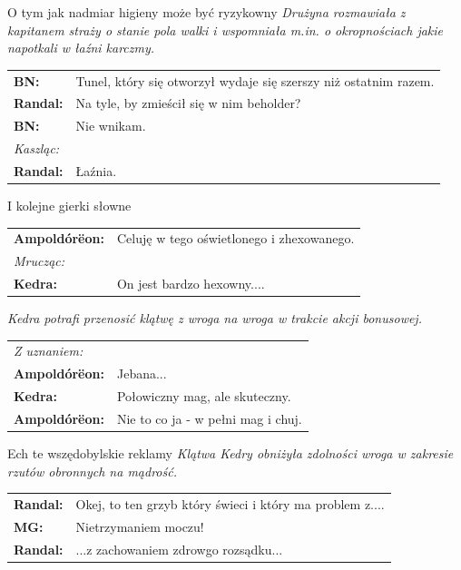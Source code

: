 \documentclass[10pt,twoside,twocolumn]{book}
\begin{document}
\begin{rpg-quotebox}{O tym jak nadmiar higieny może być ryzykowny}
   \textit{Drużyna rozmawiała z kapitanem straży o stanie pola walki i wspomniała m.in. o okropnościach jakie napotkali w łaźni karczmy.}\\

   \begin{tabularx}{\columnwidth}{lX}
      \textbf{BN:} & Tunel, który się otworzył wydaje się szerszy niż ostatnim razem.\\
      \textbf{Randal:} & Na tyle, by zmieścił się w nim beholder?\\
      \textbf{BN:} & Nie wnikam.\\
      \multicolumn{2}{l}{\textit{Kaszląc:}}\\
      \textbf{Randal:} & Łaźnia.\\
   \end{tabularx}
\end{rpg-quotebox}


\begin{rpg-quotebox}{I kolejne gierki słowne}
   \begin{tabularx}{\columnwidth}{lX}
      \textbf{Ampoldórëon:} & Celuję w tego oświetlonego i zhexowanego.\\
      \multicolumn{2}{l}{\textit{Mrucząc:}}\\
      \textbf{Kedra:} & On jest bardzo hexowny....\\
   \end{tabularx}
\end{rpg-quotebox}


\begin{rpg-quotebox}{}
   \textit{Kedra potrafi przenosić klątwę z wroga na wroga w trakcie akcji bonusowej.}\\

   \begin{tabularx}{\columnwidth}{lX}
      \multicolumn{2}{l}{\textit{Z uznaniem:}}\\
      \textbf{Ampoldórëon:} & Jebana...\\
      \textbf{Kedra:} & Połowiczny mag, ale skuteczny.\\
      \textbf{Ampoldórëon:} & Nie to co ja - w pełni mag i chuj.\\
   \end{tabularx}
\end{rpg-quotebox}


\begin{rpg-quotebox}{Ech te wszędobylskie reklamy}
   \textit{Klątwa Kedry obniżyła zdolności wroga w zakresie rzutów obronnych na mądrość.}\\

   \begin{tabularx}{\columnwidth}{lX}
      \textbf{Randal:} & Okej, to ten grzyb który świeci i który ma problem z....\\
      \textbf{MG:} & Nietrzymaniem moczu!\\
      \textbf{Randal:} & ...z zachowaniem zdrowgo rozsądku...\\
   \end{tabularx}
\end{rpg-quotebox}
\end{document}
